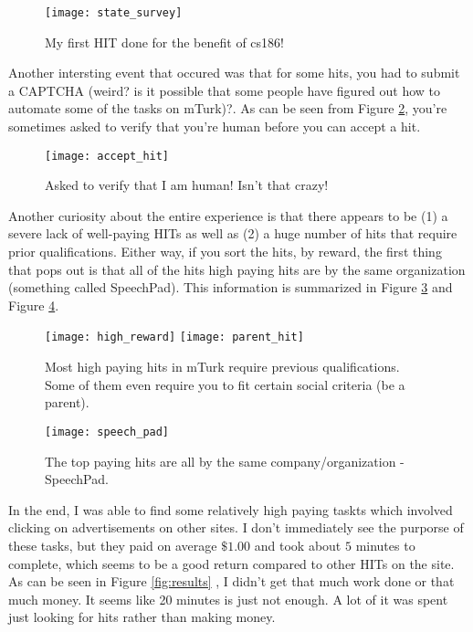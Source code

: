 \documentclass[11pt]{article}
\begin{document}
\begin{enumerate}
\begin{enumerate}
\begin{figure}[!h]
\centering
\texttt{[image: state\_survey]}
\caption{My first HIT done for the benefit of cs186!}
\label{fig:state_survey}
\end{figure}

Another intersting event that occured was that for some hits, you had to submit a CAPTCHA (weird? is it possible that some people have figured out how to automate some of the tasks on mTurk)?. As can be seen from Figure \ref{fig:accept_hit}, you're sometimes asked to verify that you're human before you can accept a hit.

\begin{figure}[!h]
\centering
\texttt{[image: accept\_hit]}
\caption{Asked to verify that I am human! Isn't that crazy!}
\label{fig:accept_hit}
\end{figure}

Another curiosity about the entire experience is that there appears to be (1) a severe lack of well-paying HITs as well as (2) a huge number of hits that require prior qualifications. Either way, if you sort the hits, by reward, the first thing that pops out is that all of the hits high paying hits are by the same organization (something called SpeechPad). This information is summarized in Figure \ref{fig:qualifications} and Figure \ref{fig:speech_pad}.

\begin{figure}[!h]
\centering
\texttt{[image: high\_reward]}
\texttt{[image: parent\_hit]}
\caption{Most high paying hits in mTurk require previous qualifications. Some of them even require you to fit certain social criteria (be a parent).}
\label{fig:qualifications}
\end{figure}


\begin{figure}[!h]
\centering
\texttt{[image: speech\_pad]}
\caption{The top paying hits are all by the same company/organization - SpeechPad.}
\label{fig:speech_pad}
\end{figure}

In the end, I was able to find some relatively high paying taskts which involved clicking on advertisements on other sites. I don't immediately see the purporse of these tasks, but they paid on average $\$1.00$ and took about $5$ minutes to complete, which seems to be a good return compared to other HITs on the site. As can be seen in Figure \ref{fig:results} , I didn't get that much work done or that much money. It seems like 20 minutes is just not enough. A lot of it was spent just looking for hits rather than making money. 


\end{enumerate}
\end{enumerate}
\end{document}
